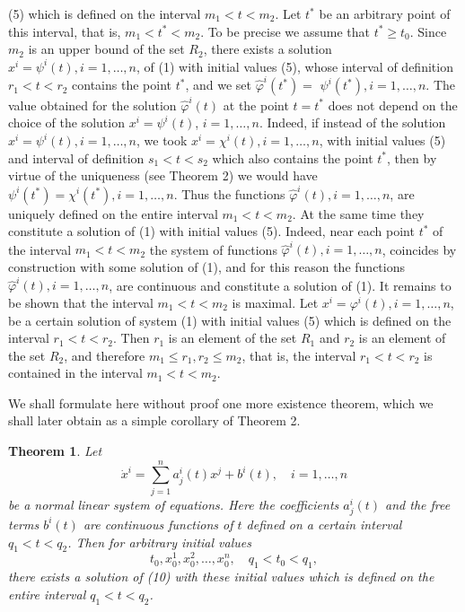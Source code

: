 \documentclass[10pt,a5paper]{book}
\theoremstyle{plain}
\newtheorem{theorem}{Theorem}
\theoremstyle{definition}
\theoremstyle{remark}
\begin{document}
(5) which is defined on the interval $m_{1}<t<m_{2}$. Let $t^{*}$ be an arbitrary point of this interval, that is, $m_{1}<t^{*}<m_{2}$. To be precise we assume that $t^{*} \geq t_{0}$. Since $m_{2}$ is an upper bound of the set $R_{2}$, there exists a solution $x^{i}=\psi^{i}(t), i=1, \ldots, n$, of (1) with initial values (5), whose interval of definition $r_{1}<t<r_{2}$ contains the point $t^{*}$, and we set $\hat{\varphi}^{i}\left(t^{*}\right)=$ $\psi^{i}\left(t^{*}\right), i=1, \ldots, n$. The value obtained for the solution $\hat{\varphi}^{i}(t)$ at the point $t=t^{*}$ does not depend on the choice of the solution $x^{i}=\psi^{i}(t)$, $i=1, \ldots, n$. Indeed, if instead of the solution $x^{i}=\psi^{i}(t), i=1, \ldots, n$, we took $x^{i}=\chi^{i}(t), i=1, \ldots, n$, with initial values (5) and interval of definition $s_{1}<t<s_{2}$ which also contains the point $t^{*}$, then by virtue of the uniqueness (see Theorem 2) we would have $\psi^{i}\left(t^{*}\right)=\chi^{i}\left(t^{*}\right), i=1, \ldots, n$. Thus the functions $\hat{\varphi}^{i}(t), i=1, \ldots, n$, are uniquely defined on the entire interval $m_{1}<t<m_{2}$. At the same time they constitute a solution of (1) with initial values (5). Indeed, near each point $t^{*}$ of the interval $m_{1}<t<m_{2}$ the system of functions $\hat{\varphi}^{i}(t), i=1, \ldots, n$, coincides by construction with some solution of (1), and for this reason the functions $\hat{\varphi}^{i}(t), i=1, \ldots, n$, are continuous and constitute a solution of (1). It remains to be shown that the interval $m_{1}<t<m_{2}$ is maximal. Let $x^{i}=\varphi^{i}(t), i=1, \ldots, n$, be a certain solution of system (1) with initial values (5) which is defined on the interval $r_{1}<t<r_{2}$. Then $r_{1}$ is an element of the set $R_{1}$ and $r_{2}$ is an element of the set $R_{2}$, and therefore $m_{1} \leq r_{1}, r_{2} \leq m_{2}$, that is, the interval $r_{1}<t<r_{2}$ is contained in the interval $m_{1}<t<m_{2}$.

We shall formulate here without proof one more existence theorem, which we shall later obtain as a simple corollary of Theorem 2.

\begin{theorem}
Let
\begin{equation*}
\dot{x}^{i}=\sum_{j=1}^{n} a_{j}^{i}(t) x^{j}+b^{i}(t), \quad i=1, \ldots, n \tag{10}
\end{equation*}
be a normal linear system of equations. Here the coefficients $a_{j}^{i}(t)$ and the free terms $b^{i}(t)$ are continuous functions of $t$ defined on a certain interval $q_{1}<t<q_{2}$. Then for arbitrary initial values
\begin{equation*}
t_{0}, x_{0}^{1}, x_{0}^{2}, \ldots, x_{0}^{n}, \quad q_{1}<t_{0}<q_{1}, \tag{11}
\end{equation*}
there exists a solution of (10) with these initial values which is defined on the entire interval $q_{1}<t<q_{2}$.
\end{theorem}
\end{document}
